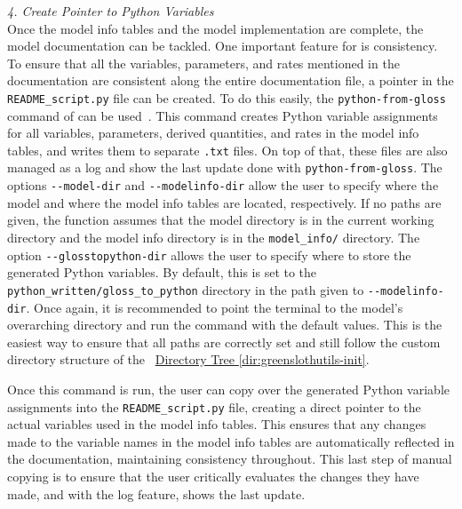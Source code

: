 \emph{4. Create Pointer to Python Variables}\\
Once the model info tables and the model implementation are complete, the model documentation can be tackled. One important feature for \greensloth{} is consistency. To ensure that all the variables, parameters, and rates mentioned in the documentation are consistent along the entire documentation file, a pointer in the \verb|README_script.py| file can be created. To do this easily, the \verb|python-from-gloss| command of \greensloth[GreenSlothUtils] can be used~. This command creates Python variable assignments for all variables, parameters, derived quantities, and rates in the model info tables, and writes them to separate \verb|.txt| files.
On top of that, these files are also managed as a log and show the last update done with \verb|python-from-gloss|. The options \verb|--model-dir| and \verb|--modelinfo-dir| allow the user to specify where the model and where the model info tables are located, respectively. If no paths are given, the function assumes that the model directory is in the current working directory and the model info directory is in the \verb|model_info/| directory. The option \verb|--glosstopython-dir| allows the user to specify where to store the generated Python variables. By default, this is set to the \verb|python_written/gloss_to_python| directory in the path given to \verb|--modelinfo-dir|. Once again, it is recommended to point the terminal to the model's overarching directory and run the command with the default values. This is the easiest way to ensure that all paths are correctly set and still follow the custom directory structure of the \greensloth{}~\hyperref[dir:greenslothutils-init]{Directory Tree \ref*{dir:greenslothutils-init}}.

Once this command is run, the user can copy over the generated Python variable assignments into the \verb|README_script.py| file, creating a direct pointer to the actual variables used in the model info tables. This ensures that any changes made to the variable names in the model info tables are automatically reflected in the documentation, maintaining consistency throughout. This last step of manual copying is to ensure that the user critically evaluates the changes they have made, and with the log feature, shows the last update.

